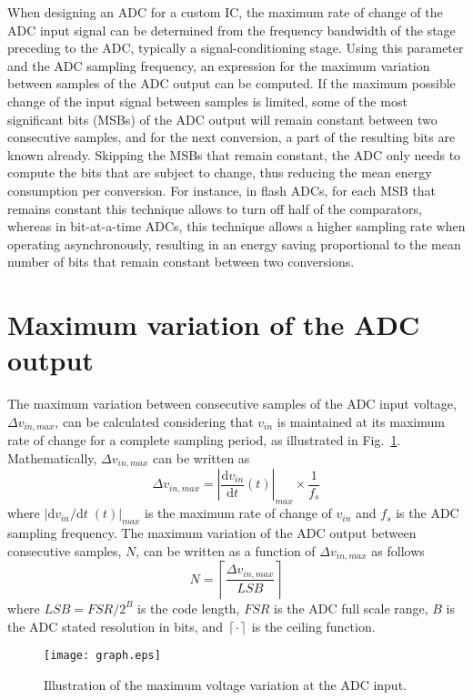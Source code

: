 \documentclass[twocolumn]{el-author}
\begin{document}
When designing an ADC for a custom IC, the maximum rate of change of the ADC input signal can be determined from the frequency bandwidth of the stage preceding to the ADC, typically a \mbox{signal-conditioning} stage. Using this parameter and the ADC sampling frequency, an expression for the maximum variation between samples of the ADC output can be computed. If the maximum possible change of the input signal between samples is limited, some of the most significant bits (MSBs) of the ADC output will remain constant between two consecutive samples, and for the next conversion, a part of the resulting bits are known already. Skipping the MSBs that remain constant, the ADC only needs to compute the bits that are subject to change, thus reducing the mean energy consumption per conversion. For instance, in flash ADCs, for each MSB that remains constant this technique allows to turn off half of the comparators, whereas in \mbox{bit-at-a-time} ADCs, this technique allows a higher sampling rate when operating asynchronously, resulting in an energy saving proportional to the mean number of bits that remain constant between two conversions.

\section{Maximum variation of the ADC output}
The maximum variation between consecutive samples of the ADC input voltage, $\Delta v_\mathit{in,max}$, can be calculated considering that $v_\mathit{in}$ is maintained at its maximum rate of change for a complete sampling period, as illustrated in Fig.~\ref{fig:maxVar}. Mathematically, $\Delta v_\mathit{in,max}$ can be written as
\begin{equation}
 \Delta v_\mathit{in,max}   = \left|\frac{\mathrm{d}v_\mathit{in}}{\mathrm{d}t}(t)\right|_\mathit{max} \times \frac{1}{f_s} \label{eq:maxVar}
\end{equation}
where $\textstyle \left|\mathrm{d}v_\mathit{in}/\mathrm{d}t\;(t)\right|_\mathit{max}$ is the maximum rate of change of $v_\mathit{in}$ and $f_s$ is the ADC sampling frequency. The maximum variation of the ADC output between consecutive samples, $N$, can be written as a function of $\Delta v_\mathit{in,max}$  as follows
\begin{equation}
N = \left\lceil \frac{\Delta v_\mathit{in,max}}{\mathit{LSB}} \right\rceil \label{eq:N1}
\end{equation}
where $\mathit{LSB} = \mathit{FSR}/ 2^B$ is the code length, $\mathit{FSR}$ is the ADC full scale range, $B$ is the ADC stated resolution in bits, and $\left\lceil\cdot\right\rceil$ is the ceiling function.
\begin{figure}[!h]
	\centering
	\texttt{[image: graph.eps]}
	\caption{Illustration of the maximum voltage variation at the ADC input.}
	\label{fig:maxVar}
\end{figure}
\end{document}
